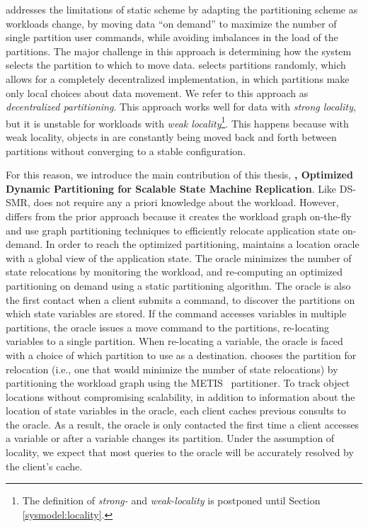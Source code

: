 \dssmr{} addresses the limitations of static scheme by adapting the partitioning
scheme as workloads change, by moving data ``on demand'' to maximize the number
of single partition user commands, while avoiding imbalances in the load of the
partitions. The major challenge in this approach is determining how the system
selects the partition to which to move data. \dssmr{} selects partitions
randomly, which allows for a completely decentralized implementation, in which
partitions make only local choices about data movement. We refer to this
approach as \emph{decentralized partitioning}. This approach works well for data
with \emph{strong locality}, but it is unstable for workloads with \emph{weak
locality}\footnote{The definition of \emph{strong-} and \emph{weak-locality} is
postponed until Section \ref{sysmodel:locality}.}. This happens because with
weak locality, objects in \dssmr{} are constantly being moved back and forth
between partitions without converging to a stable configuration.

For this reason, we introduce the main contribution of this thesis,
\textbf{\dynastar, Optimized Dynamic Partitioning for Scalable State Machine
Replication}. Like DS-SMR, \dynastar does not require any a priori knowledge
about the workload. However, \dynastar differs from the prior approach because
it creates the workload graph on-the-fly and use graph partitioning techniques
to efficiently relocate application state on-demand. In order to reach the
optimized partitioning,  \dynastar maintains a location oracle with a global
view of the application state. The oracle minimizes the number of state
relocations by monitoring the workload, and re-computing an optimized
partitioning on demand using a static partitioning algorithm. The oracle is also
the first contact when a client submits a command, to discover the partitions on
which state variables are stored. If the command accesses variables in multiple
partitions, the oracle issues a move command to the partitions, re-locating
variables to a single partition. When re-locating a variable, the oracle is
faced with a choice of which partition to use as a destination. \dynastar
chooses the partition for relocation (i.e., one that would minimize the number
of state relocations) by partitioning the workload graph using the
METIS~\cite{Abou-Rjeili:2006} partitioner. To track object locations without
compromising scalability, in addition to information about the location of state
variables in the oracle, each client caches previous consults to the oracle. As
a result, the oracle is only contacted the first time a client accesses a
variable or after a variable changes its partition. Under the assumption of
locality, we expect that most queries to the oracle will be accurately resolved
by the client's cache.


